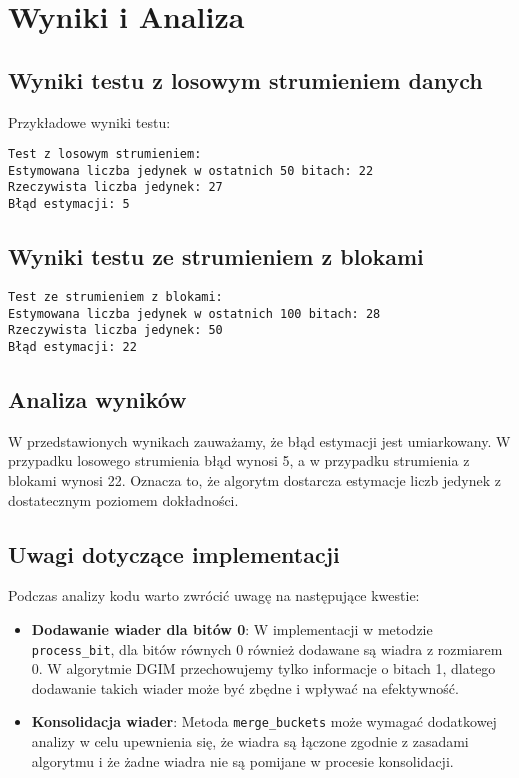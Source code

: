 \documentclass{article}
\begin{document}
\newpage

\section{Wyniki i Analiza}

\subsection{Wyniki testu z losowym strumieniem danych}

Przykładowe wyniki testu:

\begin{verbatim}
Test z losowym strumieniem:
Estymowana liczba jedynek w ostatnich 50 bitach: 22
Rzeczywista liczba jedynek: 27
Błąd estymacji: 5
\end{verbatim}

\subsection{Wyniki testu ze strumieniem z blokami}

\begin{verbatim}
Test ze strumieniem z blokami:
Estymowana liczba jedynek w ostatnich 100 bitach: 28
Rzeczywista liczba jedynek: 50
Błąd estymacji: 22
\end{verbatim}

\subsection{Analiza wyników}

W przedstawionych wynikach zauważamy, że błąd estymacji jest umiarkowany. W przypadku losowego strumienia błąd wynosi 5, a w przypadku strumienia z blokami wynosi 22. Oznacza to, że algorytm dostarcza estymacje liczb jedynek z dostatecznym poziomem dokładności.

\subsection{Uwagi dotyczące implementacji}

Podczas analizy kodu warto zwrócić uwagę na następujące kwestie:

\begin{itemize}
    \item \textbf{Dodawanie wiader dla bitów 0}: W implementacji w metodzie \texttt{process\_bit}, dla bitów równych 0 również dodawane są wiadra z rozmiarem 0. W algorytmie DGIM przechowujemy tylko informacje o bitach 1, dlatego dodawanie takich wiader może być zbędne i wpływać na efektywność.
    \item \textbf{Konsolidacja wiader}: Metoda \texttt{merge\_buckets} może wymagać dodatkowej analizy w celu upewnienia się, że wiadra są łączone zgodnie z zasadami algorytmu i że żadne wiadra nie są pomijane w procesie konsolidacji.
\end{itemize}
\end{document}
